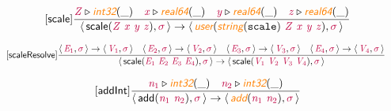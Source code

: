 \documentclass[10pt,leqno,fleqn]{article}
\newcommand{\artVariable}[1]{\mbox{\color{purple}\em #1\/}}
\newcommand{\artConstructor}[1]{\mbox{\sf #1}}
\newcommand{\artCaseInsensitiveLiteral}[1]{\mbox{\tt #1}}
\newcommand{\artSpecial}[1]{\mbox{\color{orange}\sf\em #1}}
\begin{document}
\begin{equation}
\tag*{[\artConstructor{\sf scale}]}
\begin{split}\frac{ \artVariable{Z}\triangleright \artSpecial{int32}(\_) \quad  \artVariable{x}\triangleright \artSpecial{real64}(\_) \quad  \artVariable{y}\triangleright \artSpecial{real64}(\_) \quad  \artVariable{z}\triangleright \artSpecial{real64}(\_) }{\langle\, \artConstructor{\sf scale}(\artVariable{Z}\ \artVariable{x}\ \artVariable{y}\ \artVariable{z}), \artVariable{$\sigma$}\,\rangle \rightarrow \langle\, \artSpecial{user}(\artSpecial{string}(\artCaseInsensitiveLiteral{scale})\ \artVariable{Z}\ \artVariable{x}\ \artVariable{y}\ \artVariable{z}), \artVariable{$\sigma$}\,\rangle }
\end{split}
\end{equation}

\begin{equation}
\tag*{[\artConstructor{\sf scaleResolve}]}
\begin{split}\frac{\langle\, \artVariable{E$_{1}$}, \artVariable{$\sigma$}\,\rangle \rightarrow \langle\, \artVariable{V$_{1}$}, \artVariable{$\sigma$}\,\rangle \quad \langle\, \artVariable{E$_{2}$}, \artVariable{$\sigma$}\,\rangle \rightarrow \langle\, \artVariable{V$_{2}$}, \artVariable{$\sigma$}\,\rangle \quad \langle\, \artVariable{E$_{3}$}, \artVariable{$\sigma$}\,\rangle \rightarrow \langle\, \artVariable{V$_{3}$}, \artVariable{$\sigma$}\,\rangle \quad \langle\, \artVariable{E$_{4}$}, \artVariable{$\sigma$}\,\rangle \rightarrow \langle\, \artVariable{V$_{4}$}, \artVariable{$\sigma$}\,\rangle }{\langle\, \artConstructor{\sf scale}(\artVariable{E$_{1}$}\ \artVariable{E$_{2}$}\ \artVariable{E$_{3}$}\ \artVariable{E$_{4}$}), \artVariable{$\sigma$}\,\rangle \rightarrow \langle\, \artConstructor{\sf scale}(\artVariable{V$_{1}$}\ \artVariable{V$_{2}$}\ \artVariable{V$_{3}$}\ \artVariable{V$_{4}$}), \artVariable{$\sigma$}\,\rangle }
\end{split}
\end{equation}

\begin{equation}
\tag*{[\artConstructor{\sf addInt}]}
\begin{split}\frac{ \artVariable{n$_{1}$}\triangleright \artSpecial{int32}(\_) \quad  \artVariable{n$_{2}$}\triangleright \artSpecial{int32}(\_) }{\langle\, \artConstructor{\sf add}(\artVariable{n$_{1}$}\ \artVariable{n$_{2}$}), \artVariable{$\sigma$}\,\rangle \rightarrow \langle\, \artSpecial{add}(\artVariable{n$_{1}$}\ \artVariable{n$_{2}$}), \artVariable{$\sigma$}\,\rangle }
\end{split}
\end{equation}
\end{document}
